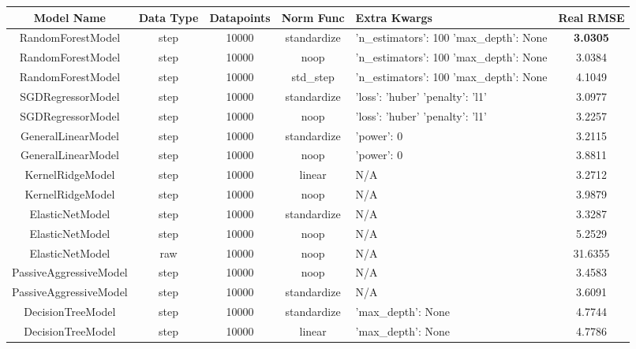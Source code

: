 \documentclass{article}
\newenvironment{changemargin}[2]{%
\begin{list}{}{%
\setlength{\topsep}{0pt}%
\setlength{\leftmargin}{#1}%
\setlength{\rightmargin}{#2}%
\setlength{\listparindent}{\parindent}%
\setlength{\itemindent}{\parindent}%
\setlength{\parsep}{\parskip}%
}%
\item[]}{\end{list}}
\begin{document}
\begin{changemargin}{-3cm}{-1cm}
\begin{minipage}{\linewidth}
\centering
{} \label{tab:title} 
\begin{tabular}{|c|c|c|c|p{4cm}|c| }\toprule[1.5pt]
Model Name & Data Type & Datapoints & Norm Func & Extra Kwargs & Real RMSE \\\hline\hline
RandomForestModel & step & 10000 & standardize & 'n\_estimators': 100 \newline 'max\_depth': None & \bf 3.0305 \\\hline
RandomForestModel & step & 10000 & noop & 'n\_estimators': 100 \newline 'max\_depth': None & 3.0384 \\\hline
RandomForestModel & step & 10000 & std\_step & 'n\_estimators': 100 \newline 'max\_depth': None & 4.1049 \\\hline
SGDRegressorModel & step & 10000 & standardize & 'loss': 'huber' \newline 'penalty': 'l1' & 3.0977 \\\hline
SGDRegressorModel & step & 10000 & noop & 'loss': 'huber' \newline 'penalty': 'l1' & 3.2257 \\\hline
GeneralLinearModel & step & 10000 & standardize & 'power': 0 & 3.2115 \\\hline
GeneralLinearModel & step & 10000 & noop & 'power': 0 & 3.8811 \\\hline
KernelRidgeModel & step & 10000 & linear & N/A & 3.2712 \\\hline
KernelRidgeModel & step & 10000 & noop & N/A & 3.9879 \\\hline
ElasticNetModel & step & 10000 & standardize & N/A & 3.3287 \\\hline
ElasticNetModel & step & 10000 & noop & N/A & 5.2529 \\\hline
ElasticNetModel & raw & 10000 & noop & N/A & 31.6355 \\\hline
PassiveAggressiveModel & step & 10000 & noop & N/A & 3.4583 \\\hline
PassiveAggressiveModel & step & 10000 & standardize & N/A & 3.6091 \\\hline
DecisionTreeModel & step & 10000 & standardize & 'max\_depth': None & 4.7744 \\\hline
DecisionTreeModel & step & 10000 & linear & 'max\_depth': None & 4.7786 \\\hline

\end{tabular}
\end{minipage}
\end{changemargin}
\end{document}
